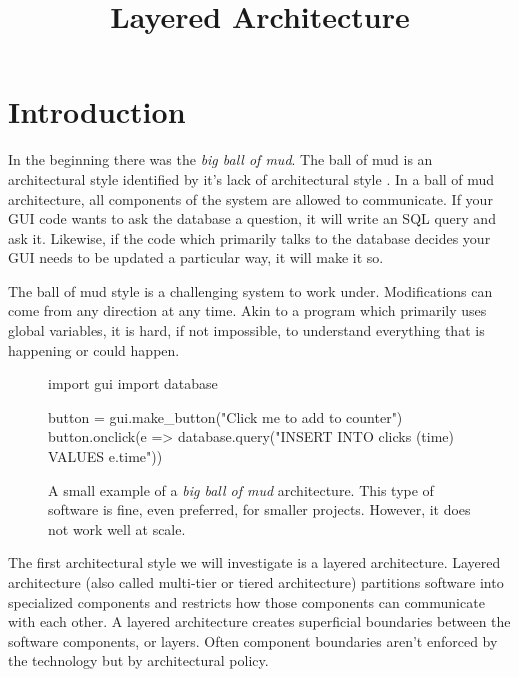 \title{Layered Architecture}
\maketitle

\section{Introduction}
In the beginning there was the \textsl{big ball of mud}.
The ball of mud is an architectural style identified by it's lack of architectural style \cite{ballofmud}.
In a ball of mud architecture, all components of the system are allowed to communicate.
If your GUI code wants to ask the database a question, it will write an SQL query and ask it.
Likewise, if the code which primarily talks to the database decides your GUI needs to be updated a particular way, it will make it so.

The ball of mud style is a challenging system to work under.
Modifications can come from any direction at any time.
Akin to a program which primarily uses global variables,
it is hard, if not impossible,
to understand everything that is happening or could happen.


\begin{figure}[ht]
\begin{code}[style=python]{}
import gui
import database

button = gui.make_button("Click me to add to counter")
button.onclick(e => 
    database.query("INSERT INTO clicks (time) VALUES {{e.time}}"))
\end{code}
\caption{
A small example of a \textsl{big ball of mud} architecture.
This type of software is fine, even preferred, for smaller projects.
However, it does not work well at scale.
}
\end{figure}

The first architectural style we will investigate is a layered architecture.
Layered architecture (also called multi-tier or tiered architecture) 
partitions software into specialized components and restricts how those components can communicate with each other.
A layered architecture creates superficial boundaries between the software components, or layers.
Often component boundaries aren't enforced by the technology but by architectural policy.

